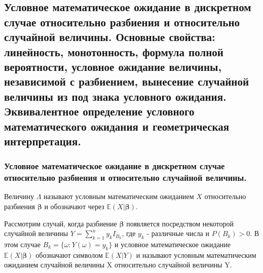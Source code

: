 \subsection{Условное математическое ожидание в дискретном случае относительно разбиения и относительно случайной величины. Основные свойства: линейность, монотонность, формула полной вероятности, условное ожидание величины, независимой с разбиением, вынесение случайной величины из под знака условного ожидания. Эквивалентное определение условного математического ожидания и геометрическая интерпретация.}

\subsubsection{Условное математическое ожидание в дискретном случае относительно разбиения и относительно случайной величины.}
\begin{definition}
	Величину $\Lambda$ называют условным математическим ожиданием $X$ относительно разбиения $\boldsymbol{\beta}$ и обозначают через $\mathbb{E}(X|\boldsymbol{\beta})$.
\end{definition}

\begin{definition}
Рассмотрим случай, когда разбиение $\boldsymbol{\beta}$ появляется посредством некоторой случайной величины $Y = \sum_{k=1}^{n}y_kI_{B_k}$, где $y_k$ - различные числа и $P(B_k) > 0$. В этом случае $B_k = \{\omega : Y (\omega) = y_k\}$ и условное математическое ожидание $\mathbb{E}(X|\boldsymbol{\beta})$ обозначают символом $\mathbb{E}(X|Y)$ и называют условным математическим ожиданием случайной величины X относительно случайной величины Y.
\end{definition}

